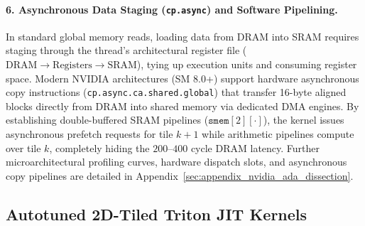 \paragraph{6. Asynchronous Data Staging (\texttt{cp.async}) and Software Pipelining.}
In standard global memory reads, loading data from DRAM into SRAM requires staging through the thread's architectural register file ($\text{DRAM} \to \text{Registers} \to \text{SRAM}$), tying up execution units and consuming register space. Modern NVIDIA architectures (SM 8.0+) support hardware asynchronous copy instructions (\texttt{cp.async.ca.shared.global}) that transfer 16-byte aligned blocks directly from DRAM into shared memory via dedicated DMA engines. By establishing double-buffered SRAM pipelines ($\mathtt{smem}[2][\cdot]$), the kernel issues asynchronous prefetch requests for tile $k+1$ while arithmetic pipelines compute over tile $k$, completely hiding the $200\text{--}400$ cycle DRAM latency. Further microarchitectural profiling curves, hardware dispatch slots, and asynchronous copy pipelines are detailed in Appendix~\ref{sec:appendix_nvidia_ada_dissection}.

\subsection{Autotuned 2D-Tiled Triton JIT Kernels}
\label{subsec:triton_architecture}

